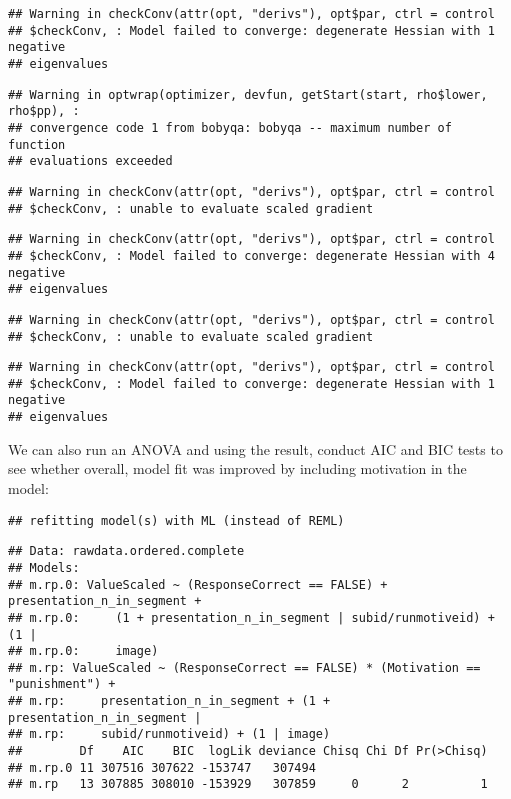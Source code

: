 \documentclass[]{article}
\begin{document}
\begin{verbatim}
## Warning in checkConv(attr(opt, "derivs"), opt$par, ctrl = control
## $checkConv, : Model failed to converge: degenerate Hessian with 1 negative
## eigenvalues
\end{verbatim}

\begin{verbatim}
## Warning in optwrap(optimizer, devfun, getStart(start, rho$lower, rho$pp), :
## convergence code 1 from bobyqa: bobyqa -- maximum number of function
## evaluations exceeded
\end{verbatim}

\begin{verbatim}
## Warning in checkConv(attr(opt, "derivs"), opt$par, ctrl = control
## $checkConv, : unable to evaluate scaled gradient
\end{verbatim}

\begin{verbatim}
## Warning in checkConv(attr(opt, "derivs"), opt$par, ctrl = control
## $checkConv, : Model failed to converge: degenerate Hessian with 4 negative
## eigenvalues
\end{verbatim}

\begin{verbatim}
## Warning in checkConv(attr(opt, "derivs"), opt$par, ctrl = control
## $checkConv, : unable to evaluate scaled gradient
\end{verbatim}

\begin{verbatim}
## Warning in checkConv(attr(opt, "derivs"), opt$par, ctrl = control
## $checkConv, : Model failed to converge: degenerate Hessian with 1 negative
## eigenvalues
\end{verbatim}

We can also run an ANOVA and using the result, conduct AIC and BIC tests
to see whether overall, model fit was improved by including motivation
in the model:

\begin{verbatim}
## refitting model(s) with ML (instead of REML)
\end{verbatim}

\begin{verbatim}
## Data: rawdata.ordered.complete
## Models:
## m.rp.0: ValueScaled ~ (ResponseCorrect == FALSE) + presentation_n_in_segment + 
## m.rp.0:     (1 + presentation_n_in_segment | subid/runmotiveid) + (1 | 
## m.rp.0:     image)
## m.rp: ValueScaled ~ (ResponseCorrect == FALSE) * (Motivation == "punishment") + 
## m.rp:     presentation_n_in_segment + (1 + presentation_n_in_segment | 
## m.rp:     subid/runmotiveid) + (1 | image)
##        Df    AIC    BIC  logLik deviance Chisq Chi Df Pr(>Chisq)
## m.rp.0 11 307516 307622 -153747   307494                        
## m.rp   13 307885 308010 -153929   307859     0      2          1
\end{verbatim}
\end{document}
